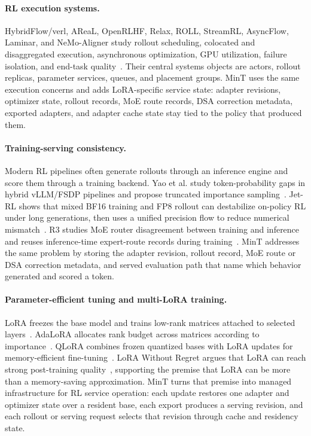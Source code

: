 \documentclass{llmxive}
\begin{document}
\paragraph{RL execution systems.}
HybridFlow/verl, AReaL, OpenRLHF, Relax, ROLL, StreamRL, AsyncFlow, Laminar, and NeMo-Aligner study rollout scheduling, colocated and disaggregated execution, asynchronous optimization, GPU utilization, failure isolation, and end-task quality~\citep{hybridflow2025,areal2025,openrlhf2024,relax2026,roll2025,streamrl2025,asyncflow2025,laminar2025,nemoaligner2024}. Their central systems objects are actors, rollout replicas, parameter services, queues, and placement groups. MinT uses the same execution concerns and adds LoRA-specific service state: adapter revisions, optimizer state, rollout records, MoE route records, DSA correction metadata, exported adapters, and adapter cache state stay tied to the policy that produced them.

\paragraph{Training-serving consistency.}
Modern RL pipelines often generate rollouts through an inference engine and score them through a training backend. Yao et al. study token-probability gaps in hybrid vLLM/FSDP pipelines and propose truncated importance sampling~\citep{rollout_training_mismatch2025}. Jet-RL shows that mixed BF16 training and FP8 rollout can destabilize on-policy RL under long generations, then uses a unified precision flow to reduce numerical mismatch~\citep{jetrl2026}. R3 studies MoE router disagreement between training and inference and reuses inference-time expert-route records during training~\citep{r3_moe_router2025}. MinT addresses the same problem by storing the adapter revision, rollout record, MoE route or DSA correction metadata, and served evaluation path that name which behavior generated and scored a token.

\paragraph{Parameter-efficient tuning and multi-LoRA training.}
LoRA freezes the base model and trains low-rank matrices attached to selected layers~\citep{lora2022}. AdaLoRA allocates rank budget across matrices according to importance~\citep{adalora2023}. QLoRA combines frozen quantized bases with LoRA updates for memory-efficient fine-tuning~\citep{qlora2023}. LoRA Without Regret argues that LoRA can reach strong post-training quality~\citep{lora_without_regret_2025}, supporting the premise that LoRA can be more than a memory-saving approximation. MinT turns that premise into managed infrastructure for RL service operation: each update restores one adapter and optimizer state over a resident base, each export produces a serving revision, and each rollout or serving request selects that revision through cache and residency state.
\end{document}
